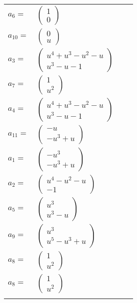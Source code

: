 \documentclass[1p]{elsarticle_modified}
\theoremstyle{definition}
\begin{document}
\begin{tabular}{m{7pt} m{180pt} m{7pt} m{180pt} }
\flushright $a_{6}=$&$\begin{pmatrix}1\\0\end{pmatrix}$ \\
\flushright $a_{10}=$&$\begin{pmatrix}0\\u\end{pmatrix}$ \\
\flushright $a_{3}=$&$\begin{pmatrix}u^4+u^3- u^2- u\\u^3- u-1\end{pmatrix}$ \\
\flushright $a_{7}=$&$\begin{pmatrix}1\\u^2\end{pmatrix}$ \\
\flushright $a_{4}=$&$\begin{pmatrix}u^4+u^3- u^2- u\\u^3- u-1\end{pmatrix}$ \\
\flushright $a_{11}=$&$\begin{pmatrix}- u\\- u^3+u\end{pmatrix}$ \\
\flushright $a_{1}=$&$\begin{pmatrix}- u^3\\- u^3+u\end{pmatrix}$ \\
\flushright $a_{2}=$&$\begin{pmatrix}u^4- u^2- u\\-1\end{pmatrix}$ \\
\flushright $a_{5}=$&$\begin{pmatrix}u^3\\u^3- u\end{pmatrix}$ \\
\flushright $a_{9}=$&$\begin{pmatrix}u^3\\u^5- u^3+u\end{pmatrix}$ \\
\flushright $a_{8}=$&$\begin{pmatrix}1\\u^2\end{pmatrix}$\\ \flushright $a_{8}=$&$\begin{pmatrix}1\\u^2\end{pmatrix}$\\&\end{tabular}
\end{document}
